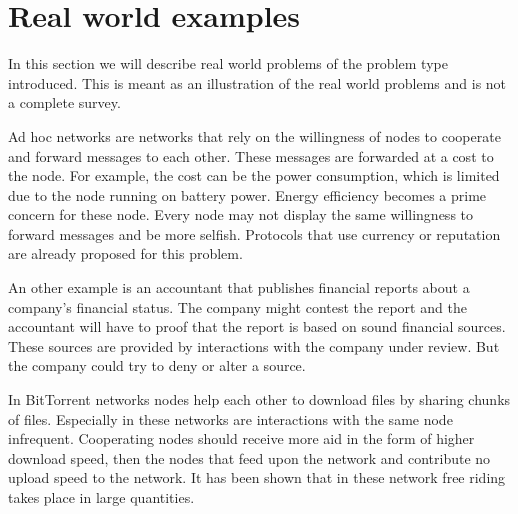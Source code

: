 \section{Real world examples}
In this section we will describe real world problems of the problem type introduced.
This is meant as an illustration of the real world problems and is not a complete survey.

Ad hoc networks are networks that rely on the willingness of nodes to cooperate
and forward messages to each other.
These messages are forwarded at a cost to the node.
For example, the cost can be the power consumption, 
which is limited due to the node running on battery power.
Energy efficiency becomes a prime concern for these node. 
Every node may not display the same willingness to forward messages and be more selfish.
Protocols that use currency or reputation are already proposed
for this problem\cite{Anderegg-AdHoc}.

An other example is an accountant that publishes financial reports about a company's financial status. 
The company might contest the report
and the accountant will have to proof that the report is based on sound financial sources.
These sources are provided by interactions with the company under review.
But the company could try to deny or alter a source\cite{Maniatis-Timeline}.

In BitTorrent networks nodes help each other to download files by sharing chunks of files.
Especially in these networks are interactions with the same node infrequent\cite{Lai-Incentives}.
Cooperating nodes should receive more aid in the form of higher download speed,
then the nodes that feed upon the network and contribute no upload speed to the network.
It has been shown that in these network
free riding takes place in large quantities\cite{Adar-Freeriding}.
